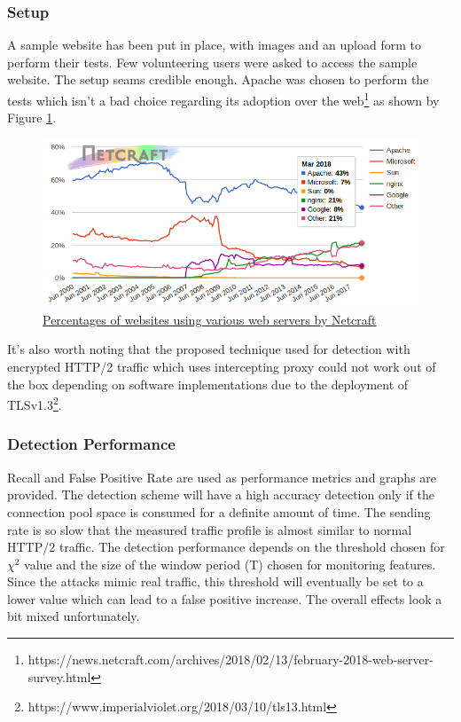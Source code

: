 \documentclass[11pt, a4paper]{article}
\begin{document}
\subsubsection{Setup}

A sample website has been put in place, with images and an upload form to perform their tests.
Few volunteering users were asked to access the sample website.
The setup seams credible enough.
Apache was chosen to perform the tests which isn't a bad choice regarding its adoption over the web\footnote{https://news.netcraft.com/archives/2018/02/13/february-2018-web-server-survey.html} as shown by Figure \ref{fig:netcraft}.

\begin{figure}[ht]
	\centering
	\includegraphics[scale=0.5]{images/netcraftWebServersUsage.png}
	\caption{\href{https://news.netcraft.com/archives/2018/02/13/february-2018-web-server-survey.html}{Percentages of websites using various web servers by Netcraft}}
	\label{fig:netcraft}
\end{figure}
It's also worth noting that the proposed technique used for detection with encrypted HTTP/2 traffic which uses intercepting proxy could not work out of the box depending on software implementations due to the deployment of TLSv1.3\footnote{https://www.imperialviolet.org/2018/03/10/tls13.html}.

\subsubsection{Detection Performance}

Recall and False Positive Rate are used as performance metrics and graphs are provided.
The detection scheme will have a high accuracy detection only if the connection pool space is consumed for a definite amount of time.
The sending rate is so slow that the measured traffic profile is almost similar to normal HTTP/2 traffic.
The detection performance depends on the threshold chosen for $\chi^2$ value and the size of the window period (\Delta T) chosen for monitoring features.
Since the attacks mimic real traffic, this threshold will eventually be set to a lower value which can lead to a false positive increase.
The overall effects look a bit mixed unfortunately.
\end{document}
